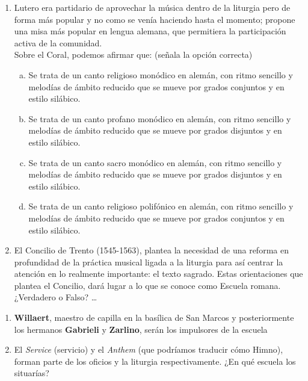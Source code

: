 \documentclass[letterpaper,12pt,notitlepage,spanish]{article}
\begin{document}
%
%
 \begin{ejercicio}[]
		\begin{enumerate}[1.-]
%
%
			\item
			Lutero era partidario de aprovechar la música dentro de la liturgia pero de forma más popular y no como se venía haciendo hasta el momento; propone una misa más popular en lengua alemana, que permitiera la participación activa de la comunidad.\\ Sobre el Coral, podemos afirmar que: (señala la opción correcta) 
		    \begin{enumerate}[a)]
		        \item Se trata de un canto religioso monódico en alemán, con ritmo sencillo y melodías de ámbito reducido que se mueve por grados conjuntos y en estilo silábico.
		        \item Se trata de un canto profano monódico en alemán, con ritmo sencillo y melodías de ámbito reducido que se mueve por grados disjuntos y en estilo silábico.
		        \item Se trata de un canto sacro monódico en alemán, con ritmo sencillo y melodías de ámbito reducido que se mueve por grados disjuntos y en estilo silábico.
		        \item Se trata de un canto religioso polifónico en alemán, con ritmo sencillo y melodías de ámbito reducido que se mueve por grados conjuntos y en estilo silábico.
		    \end{enumerate}
%
%
			\item  
			El Concilio de Trento (1545-1563), plantea la necesidad de una reforma en profundidad de la práctica musical ligada a la liturgia para así centrar la atención en lo realmente importante: el texto sagrado. Estas orientaciones que plantea el Concilio, dará lugar a lo que se conoce como Escuela romana. \\
			¿Verdadero o Falso? \ldots
%
		\end{enumerate}
 \end{ejercicio}
%
%
 \begin{ejercicio}[]
		\begin{enumerate}[1.-]
%
%
		\item 
		\textbf{Willaert}, maestro de capilla en la basílica de San Marcos y posteriormente los hermanos \textbf{Gabrieli} y \textbf{Zarlino}, serán los impulsores de la escuela \dotfill
		
		\item 
		El \textit{Service} (servicio) y el \textit{Anthem} (que podríamos traducir cómo Himno), forman parte de los oficios y la liturgia respectivamente. ¿En qué escuela los situarías? \dotfill
%
		\end{enumerate}
 \end{ejercicio}
%
\end{document}
